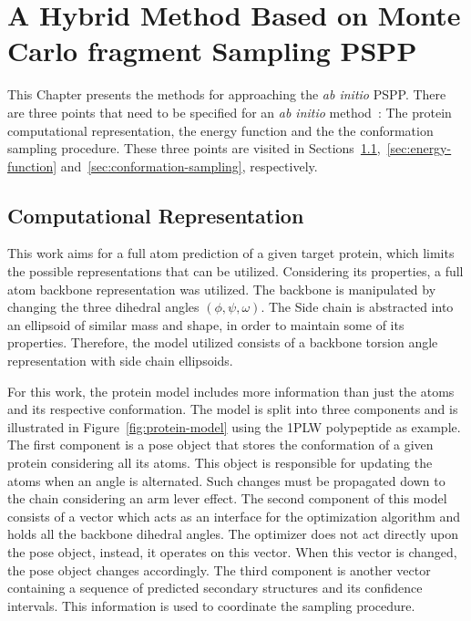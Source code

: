 \chapter{A Hybrid Method Based on Monte Carlo fragment Sampling \ac{PSPP}}\label{chap:methodology}

This Chapter presents the methods for approaching the \textit{ab initio}
\ac{PSPP}. There are three points that need to be specified for an \textit{ab
initio} method~\cite{dorn2014three}: The protein computational representation,
the energy function and the the conformation sampling procedure. These three
points are visited in
Sections~\ref{sec:computation-representation},~\ref{sec:energy-function}
and~\ref{sec:conformation-sampling}, respectively.

\section{Computational Representation}
\label{sec:computation-representation}

This work aims for a full atom prediction of a given target protein, which
limits the possible representations that can be utilized.  Considering its
properties, a full atom backbone representation was utilized.  The backbone is
manipulated by changing the three dihedral angles $(\phi, \psi, \omega)$.  The
Side chain is abstracted into an ellipsoid of similar mass and shape, in order
to maintain some of its properties. Therefore, the model utilized consists of a
backbone torsion angle representation with side chain ellipsoids.

For this work, the protein model includes more information than just the atoms
and its respective conformation. The model is split into three components and
is illustrated in Figure~\ref{fig:protein-model} using the 1PLW polypeptide as
example. The first component is a pose object that stores the conformation of a
given protein considering all its atoms. This object is responsible for
updating the atoms when an angle is alternated. Such changes must be propagated
down to the chain considering an arm lever effect. The second component of this
model consists of a vector which acts as an interface for the optimization
algorithm and holds all the backbone dihedral angles. The optimizer does not
act directly upon the pose object, instead, it operates on this vector. When
this vector is changed, the pose object changes accordingly. The third
component is another vector containing a sequence of predicted secondary
structures and its confidence intervals. This information is used to coordinate
the sampling procedure.

